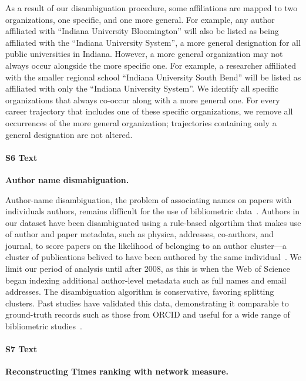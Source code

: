 \documentclass[12pt]{article} %
\begin{document}
As a result of our disambiguation procedure, some affiliations are mapped to two organizations, one specific, and one more general.
For example, any author affiliated with ``Indiana University Bloomington'' will also be listed as being affiliated with the ``Indiana University System'', a more general designation for all public universities in Indiana.
However, a more general organization may not always occur alongside the more specific one.
For example, a researcher affiliated with the smaller regional school ``Indiana University South Bend'' will be listed as affiliated with only the ``Indiana University System''.
We identify all specific organizations that always co-occur along with a more general one.
For every career trajectory that includes one of these specific organizations, we remove all occurrences of the more general organization;
trajectories containing only a general designation are not altered.



%
\paragraph*{S6 Text}
\label{si:text:disambiguation}
{\bf Author name dismabiguation.}

Author-name disambiguation, the problem of associating names on papers with individuals authors, remains difficult for the use of bibliometric data~\autocite{dangelo2020disambiguation}.
Authors in our dataset have been disambiguated using a rule-based algortihm that makes use of author and paper metadata, such as physica, addresses, co-authors, and journal, to score papers on the likelihood of belonging to an author cluster—a cluster of publications belived to have been authored by the same individual~\autocite{caron2014disambiguation}.
We limit our period of analysis until after 2008, as this is when the Web of Science began indexing additional author-level metadata such as full names and email addresses.
The disambiguation algorithm is conservative, favoring splitting clusters.
Past studies have validated this data, demonstrating it comparable to ground-truth records such as those from ORCID and useful for a wide range of bibliometric studies~\cite{sugimoto2017mostimpact, robinson2019mobility, chinchilla2018global, chinchilla2018travelban}.



%
\paragraph*{S7 Text}
\label{si:text:network_ranking}
{\bf Reconstructing Times ranking with network measure.}
\end{document}
